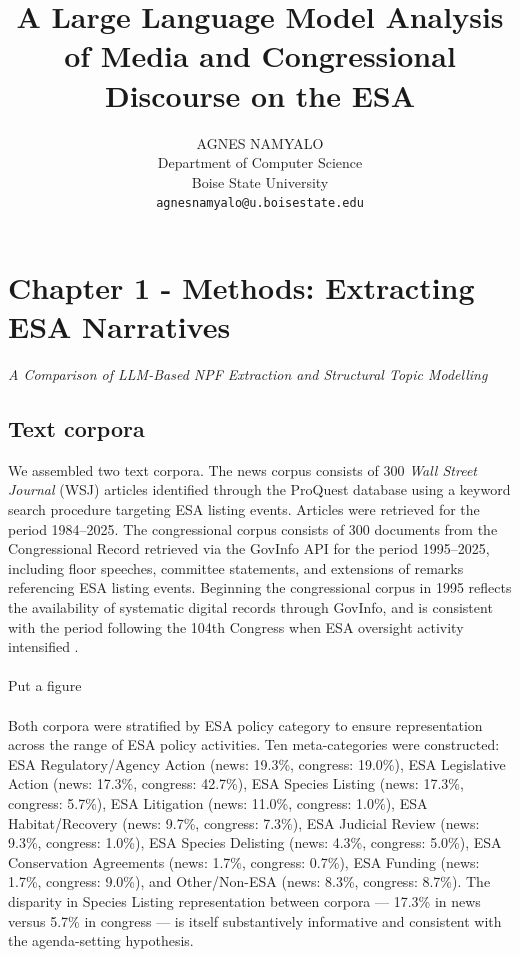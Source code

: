 \documentclass[11pt]{article}
\title{A Large Language Model Analysis of Media and Congressional Discourse on the ESA}
\author{AGNES NAMYALO\\
  Department of Computer Science \\
  Boise State University \\
  \texttt{agnesnamyalo@u.boisestate.edu}
  
}
\begin{document}
\maketitle

\section{Chapter 1 - Methods: Extracting ESA Narratives}
\begin{center}
  \textit{A Comparison of LLM-Based NPF Extraction and
          Structural Topic Modelling}
\end{center}

\subsection{Text corpora}
 
We assembled two text corpora. The news corpus consists of 300
\textit{Wall Street Journal} (WSJ) articles identified through the
ProQuest database using a keyword search procedure targeting ESA listing
events. Articles were retrieved for the period 1984--2025. The
congressional corpus consists of 300 documents from the Congressional
Record retrieved via the GovInfo API for the period 1995--2025,
including floor speeches, committee statements, and extensions of
remarks referencing ESA listing events. Beginning the congressional
corpus in 1995 reflects the availability of systematic digital records
through GovInfo, and is consistent with the period following the 104th
Congress when ESA oversight activity intensified \citep{Repetto2006}.\\
\\

Put a figure\\
\\
 
Both corpora were stratified by ESA policy category to ensure
representation across the range of ESA policy activities. Ten
meta-categories were constructed: ESA Regulatory/Agency Action (news:
19.3\%, congress: 19.0\%), ESA Legislative Action (news: 17.3\%,
congress: 42.7\%), ESA Species Listing (news: 17.3\%, congress: 5.7\%),
ESA Litigation (news: 11.0\%, congress: 1.0\%), ESA Habitat/Recovery
(news: 9.7\%, congress: 7.3\%), ESA Judicial Review (news: 9.3\%,
congress: 1.0\%), ESA Species Delisting (news: 4.3\%, congress: 5.0\%),
ESA Conservation Agreements (news: 1.7\%, congress: 0.7\%), ESA Funding
(news: 1.7\%, congress: 9.0\%), and Other/Non-ESA (news: 8.3\%,
congress: 8.7\%). The disparity in Species Listing representation
between corpora --- 17.3\% in news versus 5.7\% in congress --- is
itself substantively informative and consistent with the agenda-setting
hypothesis.
 
\end{document}
